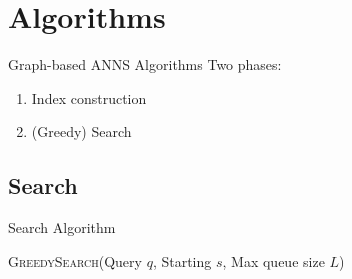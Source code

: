 \chapter{Algorithms}

{Graph-based ANNS Algorithms}
    Two phases:
    \begin{enumerate}
        \item Index construction
        \item (Greedy) Search 
    \end{enumerate}


\section{Search}

{Search Algorithm}
    \begin{algorithm}[H]
        \caption{\textsc{GreedySearch}(Query \(q\), Starting \(s\), Max queue size \(L\))}\label{alg:greedy-search}
        \begin{algorithmic}[1]
                \EndIf
            \EndWhile
        \end{algorithmic}
    \end{algorithm}


